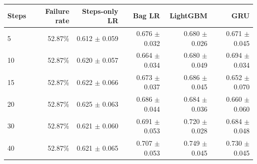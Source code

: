 \begin{tabular}{lrrrrr}
\toprule
Steps & Failure rate & Steps-only LR & Bag LR & LightGBM & GRU \\
\midrule
5 & 52.87\% & 0.612 $\pm$ 0.059 & 0.676 $\pm$ 0.032 & 0.680 $\pm$ 0.026 & 0.671 $\pm$ 0.045 \\
10 & 52.87\% & 0.620 $\pm$ 0.057 & 0.664 $\pm$ 0.034 & 0.680 $\pm$ 0.049 & 0.694 $\pm$ 0.034 \\
15 & 52.87\% & 0.622 $\pm$ 0.066 & 0.673 $\pm$ 0.037 & 0.686 $\pm$ 0.045 & 0.652 $\pm$ 0.070 \\
20 & 52.87\% & 0.625 $\pm$ 0.063 & 0.686 $\pm$ 0.044 & 0.684 $\pm$ 0.036 & 0.660 $\pm$ 0.060 \\
30 & 52.87\% & 0.621 $\pm$ 0.060 & 0.691 $\pm$ 0.053 & 0.720 $\pm$ 0.028 & 0.684 $\pm$ 0.048 \\
40 & 52.87\% & 0.621 $\pm$ 0.065 & 0.707 $\pm$ 0.053 & 0.749 $\pm$ 0.045 & 0.730 $\pm$ 0.045 \\
\bottomrule
\end{tabular}
